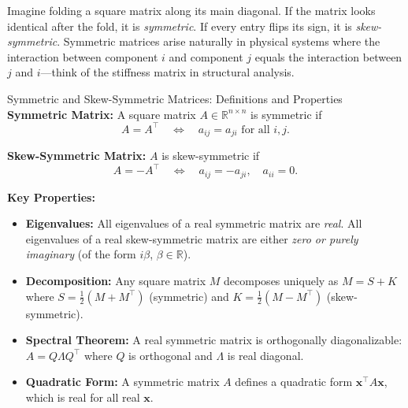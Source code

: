 \documentclass[12pt,a4paper]{article}
\begin{document}
Imagine folding a square matrix along its main diagonal.
If the matrix looks identical after the fold, it is \emph{symmetric}.
If every entry flips its sign, it is \emph{skew-symmetric}.
Symmetric matrices arise naturally in physical systems where the interaction between component $i$ and component $j$ equals the interaction between $j$ and $i$---think of the stiffness matrix in structural analysis.

\begin{infobox}{Symmetric and Skew-Symmetric Matrices: Definitions and Properties}
\textbf{Symmetric Matrix:}
A square matrix $A \in \mathbb{R}^{n \times n}$ is symmetric if
\[
  A = A^\top \quad \Longleftrightarrow \quad a_{ij} = a_{ji} \text{ for all } i,j.
\]

\textbf{Skew-Symmetric Matrix:}
$A$ is skew-symmetric if
\[
  A = -A^\top \quad \Longleftrightarrow \quad a_{ij} = -a_{ji},\quad a_{ii} = 0.
\]

\textbf{Key Properties:}
\begin{itemize}
  \item \textbf{Eigenvalues:} All eigenvalues of a real symmetric matrix are \emph{real}. All eigenvalues of a real skew-symmetric matrix are either \emph{zero or purely imaginary} (of the form $i\beta$, $\beta \in \mathbb{R}$).
  \item \textbf{Decomposition:} Any square matrix $M$ decomposes uniquely as $M = S + K$ where $S = \tfrac{1}{2}(M + M^\top)$ (symmetric) and $K = \tfrac{1}{2}(M - M^\top)$ (skew-symmetric).
  \item \textbf{Spectral Theorem:} A real symmetric matrix is orthogonally diagonalizable: $A = Q\Lambda Q^\top$ where $Q$ is orthogonal and $\Lambda$ is real diagonal.
  \item \textbf{Quadratic Form:} A symmetric matrix $A$ defines a quadratic form $\mathbf{x}^\top A \mathbf{x}$, which is real for all real $\mathbf{x}$.
\end{itemize}
\end{infobox}
\end{document}
